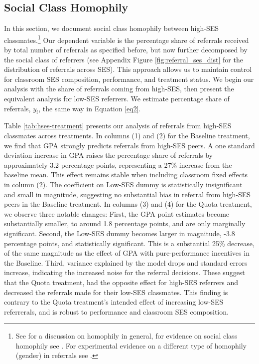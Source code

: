 \documentclass[11pt,a4paper,oneside]{article}
\begin{document}
  \subsection{Social Class Homophily}
  In this section, we document social class homophily between high-SES classmates.\footnote{See \citet{mcpherson2001birds} for a discussion on homophily in general, for evidence on social class homophily see \citet{chetty2022social,chetty2022socialb}. For experimental evidence on a different type of homophily (gender) in referrals see \citet{beaman_job_2018}.} Our dependent variable is the percentage share of referrals received by total number of referrals as specified before, but now further decomposed by the social class of referrers (see Appendix Figure \ref{fig:referral_ses_dist} for the distribution of referrals across SES). This approach allows us to maintain control for classroom SES composition, performance, and treatment status. We begin our analysis with the share of referrals coming from high-SES, then present the equivalent analysis for low-SES referrers. We estimate percentage share of referrals, $y_{i}$, the same way in Equation \ref{eq2}.

  Table \ref{tab:hses-treatment} presents our analysis of referrals from high-SES classmates across treatments. In columns (1) and (2) for the Baseline treatment, we find that GPA strongly predicts referrals from high-SES peers. A one standard deviation increase in GPA raises the percentage share of referrals by approximately 3.2 percentage points, representing a 27\% increase from the baseline mean. This effect remains stable when including classroom fixed effects in column (2). The coefficient on Low-SES dummy is statistically insignificant and small in magnitude, suggesting no substantial bias in referral from high-SES peers in the Baseline treatment. In columns (3) and (4) for the Quota treatment, we observe three notable changes: First, the GPA point estimates become  substantially smaller, to around 1.8 percentage points, and are only marginally significant. Second, the Low-SES dummy becomes larger in magnitude, -3.8 percentage points, and statistically significant. This is a substantial 25\% decrease, of the same magnitude as the effect of GPA with pure-performance incentives in the Baseline. Third, variance explained by the model drops and standard errors increase, indicating the increased noise for the referral decisions. These suggest that the Quota treatment, had the opposite effect for high-SES referrers and decreased the referrals made for their low-SES classmates. This finding is contrary to the Quota treatment's intended effect of increasing low-SES referrerals, and is robust to performance and classroom SES composition.
\end{document}
